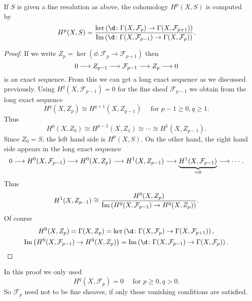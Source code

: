 \documentclass[12pt]{article}
\begin{document}
\begin{theorem}\label{thm:7-1:fine}
  If \(S\) is given a fine resolution as above, the cohomology \(H^p(X,S)\) is
  computed by \[
    H^p(X,S)= \frac{\ker\left(\dd\colon\Gamma(X,\mathcal{F}_p)\to
    \Gamma(X,\mathcal{F}_{p+1})\right)}{\img\left(\dd\colon\Gamma(X,\mathcal{F}_{p-1})
    \to\Gamma(X,\mathcal{F}_p)\right)}
  .\] 
\end{theorem}
\begin{proof}
  If we write \(Z_p=\ker(\dd\colon \mathcal{F}_p\to \mathcal{F}_{p+1})\) then \[
    0\longrightarrow Z_{p-1}\longrightarrow \mathcal{F}_{p-1}\longrightarrow Z_p\longrightarrow 0
  \] is an exact sequence. From this we can get a long exact sequence as we discussed
  previously. Using \(H^q(X,\mathcal{F}_{p-1})=0\) for the fine sheaf \(\mathcal{F}_{
  p-1}\) we obtain from the long exact sequence \[
    H^q(X,Z_p)\cong H^{q+1}(X,Z_{p-1})\quad\text{ for }p-1\ge 0,q\ge 1
  .\] Thus \[
    H^p(X,Z_0)\cong H^{p-1}(X,Z_1)\cong \cdots \cong H^1(X,Z_{p-1})
  .\] Since \(Z_0=S\), the left hand side is \(H^p(X,S)\). On the other hand, the
  right hand side appears in the long exact sequence \[
    0\longrightarrow H^0(X,\mathcal{F}_{p-1})\longrightarrow H^0(X,Z_p)\longrightarrow H^1(X,Z_{p-1})\longrightarrow
    \underbrace{H^1(X,\mathcal{F}_{p-1})}_{=0}\longrightarrow\cdots
  .\] Thus \[
    H^1(X,Z_{p-1})\cong \frac{H^0(X,Z_p)}{\operatorname{Im}\left(H^0(X,\mathcal{F}_{p-1})
    \to H^0(X,Z_p)\right)}
  .\] Of course
  \begin{gather*}
    H^0(X,Z_p)=\Gamma(X,Z_p)=\ker\left(\dd\colon\Gamma(X,\mathcal{F}_p)\to 
    \Gamma(X,\mathcal{F}_{p+1})\right), \\
    \img\left(H^0(X,\mathcal{F}_{p-1})\to H^0(X,Z_p)\right)=\img\left(\dd\colon\Gamma(
    X,\mathcal{F}_{p-1})\to \Gamma(X,\mathcal{F}_p)\right).
  \end{gather*}
\end{proof}

\begin{remark}
  In this proof we only used \[
    H^q(X,\mathcal{F}_p)=0\quad\text{ for }p\ge 0,q>0
  .\] So \(\mathcal{F}_p\) need not to be fine sheaves, if only these vanishing
  conditions are satisfied.
\end{remark}
\end{document}
